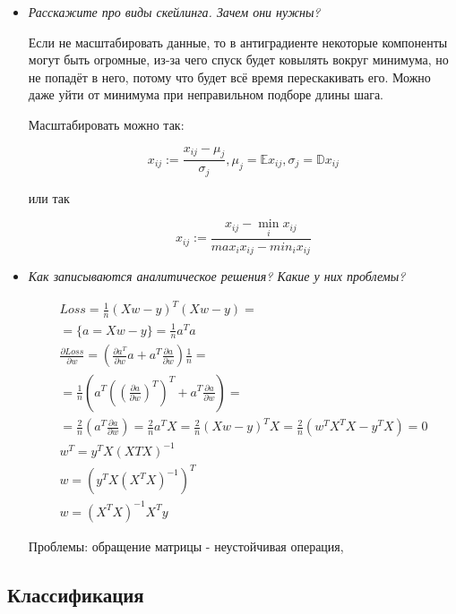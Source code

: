 \documentclass[a4paper]{article}
\begin{document}
\begin{itemize}
\item \textit{Расскажите про виды скейлинга. Зачем они нужны?}

Если не масштабировать данные, то в антиградиенте некоторые компоненты могут быть огромные, из-за чего спуск будет ковылять вокруг минимума, но не попадёт в него, потому что будет всё время перескакивать его. Можно даже уйти от минимума при неправильном подборе длины шага.

Масштабировать можно так:

\[ x_{ij} := \frac{x_{ij} - \mu_j}{\sigma_j}, \mu_j = \mathbb{E} x_{ij}, \sigma_j = \mathbb{D} x_{ij} \]

или так 

\[ x_{ij} := \frac{x_{ij} - \min_i x_{ij}}{max_i x_{ij} - min_i x_{ij}} \]

\item \textit{Как записываются аналитическое решения? Какие у них проблемы?}

\begin{equation}
\begin{gathered}
Loss = \frac{1}{n} (Xw -y)^T (Xw - y) = \\
= \{ a = Xw - y \} = \frac{1}{n} a^T a \\
\frac{\partial Loss}{\partial w} = \left( \frac{\partial a^T}{\partial w} a + a^T \frac{\partial a}{\partial w} \right) \frac{1}{n} = \\
= \frac{1}{n} \left( a^T \left( \left( \frac{\partial a}{\partial w} \right)^T \right)^T + a^T \frac{\partial a}{\partial w} \right) =  \\
= \frac{2}{n} \left( a^T \frac{\partial a}{\partial w} \right) = \frac{2}{n} a^T X = \frac{2}{n} \left( Xw-y \right)^T X = \frac{2}{n} \left( w^TX^TX-y^TX \right) = 0\\
w^T = y^TX (XTX)^{-1} \\
w = \left( y^TX (X^TX)^{-1} \right)^T\\
w = (X^TX)^{-1}X^Ty
\end{gathered}
\end{equation}

Проблемы: обращение матрицы - неустойчивая операция,

\end{itemize}


\subsection*{Классификация}
\end{document}
